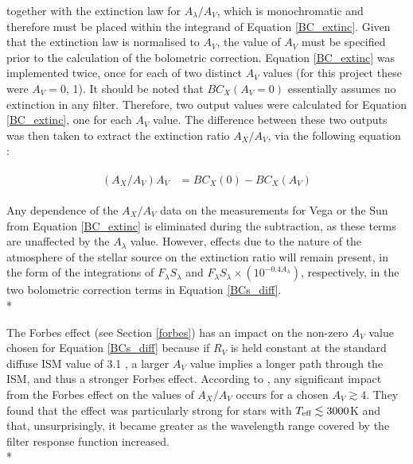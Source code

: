 \documentclass[12pt, a4paper]{report}
\begin{document}
together with the \cite{1989ApJ...345..245C} extinction law for $A_{\lambda}/A_{V}$, which is monochromatic and therefore must be placed within the integrand of Equation \ref{BC_extinc}. Given that the \cite{1989ApJ...345..245C} extinction law is normalised to $A_{V}$, the value of $A_{V}$ must be specified prior to the calculation of the bolometric correction. Equation \ref{BC_extinc} was implemented twice, once for each of two distinct $A_{V}$ values (for this project these were $A_{V} = 0$, 1). It should be noted that $BC_{X}(A_{V}=0)$ essentially assumes no extinction in any filter. Therefore, two output values were calculated for Equation \ref{BC_extinc}, one for each $A_{V}$ value. The difference between these two outputs was then taken to extract the extinction ratio $A_{X}/A_{V}$, via the following equation \citep{2008PASP..120..583G}:

\begin{align}
\begin{split}
\left(A_{X}/A_{V}\right)A_{V} &= BC_{X}(0) - BC_{X}(A_{V})
\label{BCs_diff}
\end{split}
\end{align}

Any dependence of the $A_{X}/A_{V}$ data on the measurements for Vega or the Sun from Equation \ref{BC_extinc} is eliminated during the subtraction, as these terms are unaffected by the $A_{\lambda}$ value. However, effects due to the nature of the atmosphere of the stellar source on the extinction ratio will remain present, in the form of the integrations of $F_{\lambda}S_{\lambda}$ and $F_{\lambda}S_{\lambda} \times \left( 10^{-0.4 A_{\lambda}} \right)$, respectively, in the two bolometric correction terms in Equation \ref{BCs_diff}. \\*

The Forbes effect (see Section \ref{forbes}) has an impact on the non-zero $A_{V}$ value chosen for Equation \ref{BCs_diff} because if $R_{V}$ is held constant at the standard diffuse ISM value of 3.1 \citep{1989ApJ...345..245C}, a larger $A_{V}$ value implies a longer path through the ISM, and thus a stronger Forbes effect. According to \cite{2008PASP..120..583G}, any significant impact from the Forbes effect on the values of $A_{X}/A_{V}$ occurs for a chosen $A_{V} \gtrsim 4$. They found that the effect was particularly strong for stars with $T_{\textnormal{eff}} \lesssim 3000$K and that, unsurprisingly, it became greater as the wavelength range covered by the filter response function increased.\\*
\end{document}
